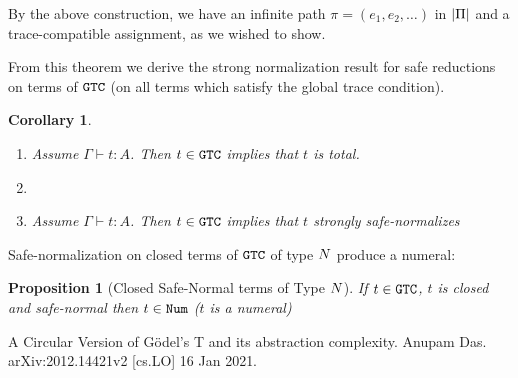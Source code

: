\documentclass{article}
\newtheorem{proposition}[theorem]{Proposition}
\newtheorem{corollary}[theorem]{Corollary}
\newenvironment{proof}[1][Proof]{\begin{trivlist}
\item[\hskip \labelsep {\bfseries #1}]}{\end{trivlist}}
\begin{document}
\begin{proof}
\begin{enumerate}
\begin{enumerate}
  \end{enumerate}

\end{enumerate}

By the above construction, we have an infinite path $\pi = (e_1,e_2,\ldots)$ in ${|\Pi|}$
and a trace-compatible assignment, as we wished to show.

  
\end{proof}


From this theorem we derive the strong normalization result for safe reductions on terms of ${\tt GTC}$
(on all terms which satisfy the global trace condition).

\begin{corollary}\label{cor:SN_GTC}
  \begin {enumerate}
  \item
   Assume  $\Gamma\vdash t:A$. Then $t \in {\tt GTC}$ implies that $t$ is total.
  \item
   \item
   Assume  $\Gamma\vdash t:A$. Then $t \in {\tt GTC}$ implies that $t$ strongly safe-normalizes
   \end{enumerate}
\end{corollary}

Safe-normalization on closed terms of ${\tt GTC}$ of type ${N}$ produce a numeral:

\begin{proposition}[Closed Safe-Normal terms of Type ${N}$]
If $t \in {\tt GTC}$, $t$ is closed and safe-normal then $t \in {\tt Num}$ ($t$ is a numeral)
\end{proposition}










\begin{thebibliography}{99}

A Circular Version of G\"{o}del's T and its abstraction complexity.
Anupam Das. arXiv:2012.14421v2 [cs.LO] 16 Jan 2021.

\end{thebibliography}
\end{document}

